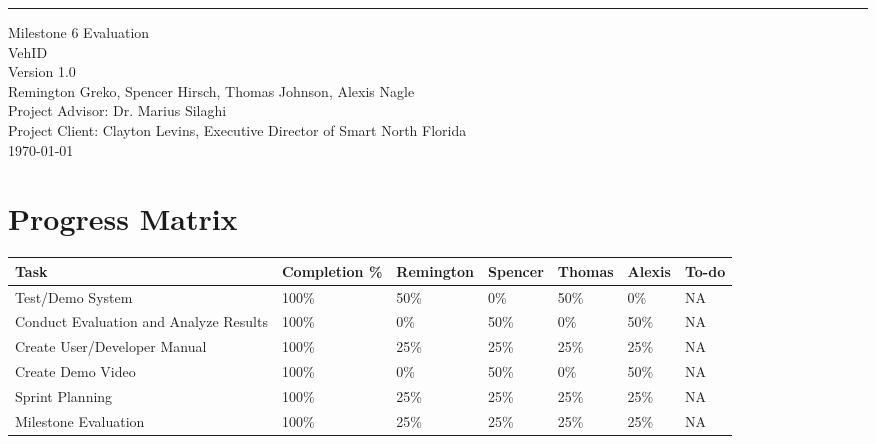 \documentclass[12pt]{article}
\date{}
\def\myversion{1.0 }
\begin{document}
\begin{flushleft}
    \rule{16cm}{5pt}\vskip1cm
    \begin{bfseries}
        \Huge{Milestone 6 Evaluation}\\
        \vspace{1.9cm}
        VehID\\
        \vspace{1.2cm}
        \LARGE{Version \myversion}\\
        \vspace{1.2cm}
        \textnormal{Remington Greko, Spencer Hirsch, Thomas Johnson, Alexis Nagle} \\
        \vspace{1.2cm}
        \textnormal{Project Advisor: Dr. Marius Silaghi}\\
        \textnormal{Project Client: Clayton Levins, Executive Director of Smart North Florida} \\
        \vspace{1.2cm}
        \textnormal{\today}\\
    \end{bfseries}
\end{flushleft}

\pagebreak

\tableofcontents

\pagebreak

\section{Progress Matrix}

\noindent\begin{center}
  \begin{tabular}{||p{3cm}|p{2.6cm}|p{2.3cm}|p{1.6cm}|p{1.6cm}|p{1.2cm}|p{2cm}||}
    \hline
    \hline
    \textbf{Task} & \textbf{Completion \%} & \textbf{Remington} & \textbf{Spencer} & \textbf{Thomas} & \textbf{Alexis} & \textbf{To-do} \\
    \hline
    Test/Demo System & 100\% & 50\% & 0\% & 50\% & 0\%  & NA\\
    \hline
    Conduct Evaluation and Analyze Results & 100\% & 0\% & 50\% & 0\% & 50\%  & NA\\
    \hline
    Create User/Developer Manual & 100\% & 25\% & 25\% & 25\% & 25\%  & NA\\
    \hline
    Create Demo Video & 100\% & 0\% & 50\% & 0\% & 50\%  & NA\\
    \hline
    Sprint Planning & 100\% & 25\% & 25\% & 25\% & 25\%  & NA\\
    \hline
    Milestone Evaluation & 100\% & 25\% & 25\% & 25\% & 25\%  & NA\\
    \hline
    \hline
  \end{tabular}
\end{center}
\end{document}

